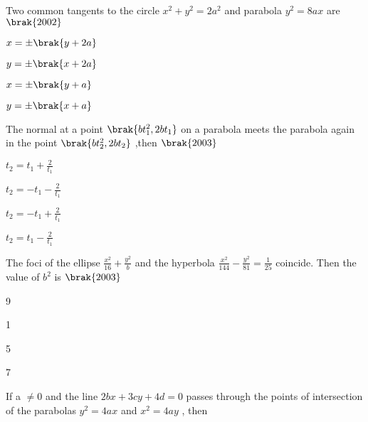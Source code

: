 \iffalse
\title{Assignment-01}
\author{EE24BTECH11036 - KRISHNA PATIL}
\section{mains}
\fi

\item Two common tangents to the circle {$ x^2+y^2=2a^2 $} and parabola {$ y^2 = 8ax $} are \hfill{{$\brak{2002} $}}
\begin{enumerate}
\begin{multicols}{2}
\item  {$ x = \pm { \brak{y+2a}} $}
\item  {$ y = \pm { \brak{x+2a}} $}
\item  {$ x = \pm { \brak{y+a}} $}
\item  {$ y = \pm { \brak{x+a}} $}
\end{multicols}
\end{enumerate}
\hfill
\item The normal at a point {$ \brak{bt_1^2 ,2bt_1} $} on a parabola meets the parabola again in the point {$ \brak{bt_2^2 ,2bt _2} $}  ,then \hfill {{$ \brak{2003} $}}
\begin{enumerate}
\begin{multicols}{2}
\item  {$ t_2 = t_1 + \frac{2}{t_1} $}
\item  {$ t_2 = -t_1 - \frac{2}{t_1} $}
\item  {$ t_2 = -t_1 + \frac{2}{t_1} $}
\item  {$ t_2 = t_1 - \frac{2}{t_1} $}
\end{multicols}
\end{enumerate}
\hfill
\item The foci of the ellipse {$ \frac{x^2}{16} + \frac{y^2}{b} $} and the hyperbola {$ \frac{x^2}{144} - \frac{y^2}{81} = \frac{1}{25} $} coincide. Then the value of {$ b^2 $} is 
\hfill{{$ \brak{2003} $}}
\begin{enumerate}
\begin{multicols}{2}
\item 9	
\item 1
\item 5
\item 7
\end{multicols}
\end{enumerate}
\hfill
\item If a $ \neq 0 $ and the line {$ 2bx +3cy + 4d = 0 $} passes through the points of intersection of the parabolas {$ y^2 = 4ax $} and {$  x^2 = 4ay $} , then 
